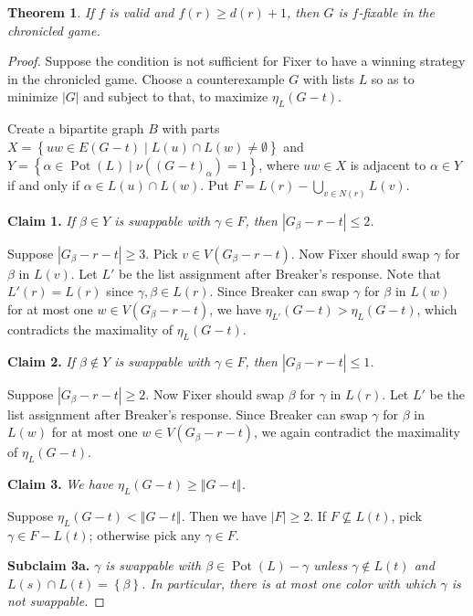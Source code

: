 \documentclass[12pt,reqno]{amsart}
\theoremstyle{plain}
\newtheorem{thm}{Theorem}
\theoremstyle{definition}
\theoremstyle{remark}
\newcommand{\set}[1]{\left\{ #1 \right\}}
\newcommand{\setb}[3]{\left\{ #1 \in #2 \mid #3 \right\}}
\newcommand{\card}[1]{\left|#1\right|}
\newcommand{\size}[1]{\left\Vert#1\right\Vert}
\newcommand{\pot}{\operatorname{Pot}}
\begin{document}
\begin{thm}\label{SubdividedStarWithLowCenter}
If $f$ is valid and $f(r) \ge d(r) + 1$, then $G$ is $f$-fixable in the chronicled game.
\end{thm}
\begin{proof}
Suppose the condition is not sufficient for Fixer to have a winning strategy in the chronicled game.  Choose a counterexample $G$ with lists $L$ so as to minimize $\card{G}$ and subject to that, to maximize $\eta_L(G - t)$.

Create a bipartite graph $B$ with parts $X = \setb{uw}{E(G - t)}{L(u) \cap L(w) \ne \emptyset}$ and $Y = \setb{\alpha}{\pot(L)}{\nu((G - t)_\alpha) = 1}$, where $uw \in X$ is adjacent to $\alpha \in Y$ if and only if $\alpha \in L(u) \cap L(w)$.  Put $F = L(r) - \bigcup_{v \in N(r)} L(v)$.

\noindent\textbf{Claim 1.  }\textit{If $\beta \in Y$ is swappable with $\gamma \in F$, then $\card{G_\beta - r - t} \le 2$.}

Suppose $\card{G_\beta - r - t} \ge 3$.  Pick $v \in V(G_\beta - r - t)$.  Now Fixer should swap $\gamma$ for $\beta$ in $L(v)$.  Let $L'$ be the list assignment after Breaker's response. Note that $L'(r) = L(r)$ since $\gamma, \beta \in L(r)$.  Since Breaker can swap $\gamma$ for $\beta$ in $L(w)$ for at most one $w \in V(G_\beta - r - t)$, we have $\eta_{L'}(G - t) > \eta_L(G - t)$, which contradicts the maximality of $\eta_L(G - t)$.

\noindent\textbf{Claim 2.  }\textit{If $\beta \not \in Y$ is swappable with $\gamma \in F$, then $\card{G_\beta - r - t} \le 1$.}

Suppose $\card{G_\beta - r - t} \ge 2$.  Now Fixer should swap $\beta$ for $\gamma$ in $L(r)$. Let $L'$ be the list assignment after Breaker's response.  Since Breaker can swap $\gamma$ for $\beta$ in $L(w)$ for at most one $w \in V(G_\beta - r - t)$, we again contradict the maximality of $\eta_L(G - t)$.

\noindent\textbf{Claim 3.  }\textit{We have $\eta_L(G - t) \ge \size{G - t}$.}

Suppose $\eta_L(G - t) < \size{G - t}$. Then we have $\card{F} \ge 2$. If $F \not \subseteq L(t)$, pick $\gamma \in F - L(t)$; otherwise pick any $\gamma \in F$.   


\noindent\textbf{Subclaim 3a.  }\textit{$\gamma$ is swappable with $\beta \in \pot(L) - \gamma$ unless $\gamma \not \in L(t)$ and $L(s) \cap L(t) = \set{\beta}$.  In particular, there is at most one color with which $\gamma$ is not swappable.}


\end{proof}
\end{document}
